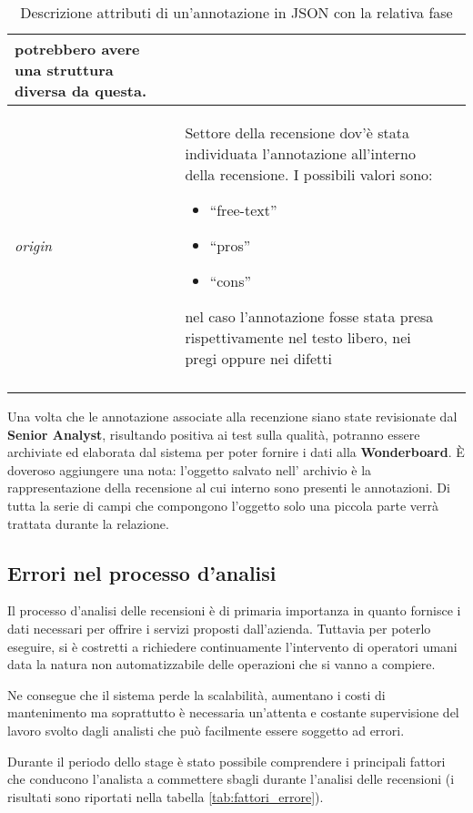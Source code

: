 \begin{center}
\begin{longtable}{|>{\centering}p{2.2cm}|p{8cm}|>{\centering}p{2.5cm}|}
potrebbero avere una struttura diversa da questa. &
\nameref{salvarla} \tabularnewline\hline
\textit{origin} &
Settore della recensione dov'è stata individuata l'annotazione all'interno della
recensione. I possibili valori sono:
\begin{itemize}
\item ``free-text''
\item ``pros''
\item ``cons''
\end{itemize}
nel caso l'annotazione fosse stata presa rispettivamente nel testo libero, nei
pregi oppure nei difetti &
\nameref{evidenziarla} \tabularnewline \hline
\caption{Descrizione attributi di un'annotazione in JSON con la relativa fase}
\label{tab:attributi_annotazione}
\end{longtable}
\end{center}

Una volta che le annotazione associate alla recenzione siano state revisionate
dal \textbf{Senior Analyst}, risultando positiva ai test sulla qualità, potranno
essere archiviate ed elaborata dal sistema per poter fornire i dati alla
\textbf{Wonderboard}. È doveroso aggiungere una nota: l'oggetto salvato nell'
archivio è la rappresentazione della recensione al cui interno sono presenti
le annotazioni. Di tutta la serie di campi che compongono l'oggetto solo una
piccola parte verrà trattata durante la relazione.

\subsection{Errori nel processo d'analisi}
Il processo d'analisi delle recensioni è di primaria importanza in quanto
fornisce i dati necessari per offrire i servizi proposti dall'azienda.
Tuttavia per poterlo eseguire, si è costretti a richiedere continuamente
l'intervento di operatori umani data la natura non automatizzabile delle
operazioni che si vanno a compiere.

Ne consegue che il sistema perde la scalabilità, aumentano i costi di mantenimento
ma soprattutto è necessaria un'attenta e costante supervisione del lavoro svolto
dagli analisti che può facilmente essere soggetto ad errori.

Durante il periodo dello stage è stato possibile comprendere i principali
fattori che conducono l'analista a commettere sbagli durante l'analisi delle
recensioni (i risultati sono riportati nella tabella \ref{tab:fattori_errore}).

